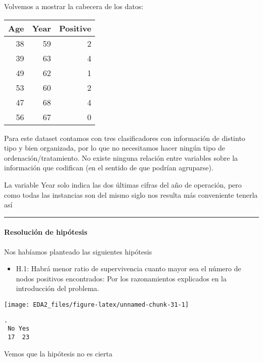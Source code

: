 \documentclass[
]{article}
\providecommand{\tightlist}{%
  \setlength{\itemsep}{0pt}\setlength{\parskip}{0pt}}
\begin{document}
Volvemos a mostrar la cabecera de los datos:

\begin{tabular}{r|r|r}
\hline
Age & Year & Positive\\
\hline
38 & 59 & 2\\
\hline
39 & 63 & 4\\
\hline
49 & 62 & 1\\
\hline
53 & 60 & 2\\
\hline
47 & 68 & 4\\
\hline
56 & 67 & 0\\
\hline
\end{tabular}

Para este dataset contamos con tres clasificadores con información de
distinto tipo y bien organizada, por lo que no necesitamos hacer ningún
tipo de ordenación/tratamiento. No existe ninguna relación entre
variables sobre la información que codifican (en el sentido de que
podrían agruparse).

La variable Year solo indica las dos últimas cifras del año de
operación, pero como todas las instancias son del mismo siglo nos
resulta más conveniente tenerla así

\begin{center}\rule{0.5\linewidth}{0.5pt}\end{center}

\hypertarget{resoluciuxf3n-de-hipuxf3tesis}{%
\paragraph{Resolución de
hipótesis}\label{resoluciuxf3n-de-hipuxf3tesis}}

Nos habíamos planteado las siguientes hipótesis

\begin{itemize}
\tightlist
\item
  H.1: Habrá menor ratio de supervivencia cuanto mayor sea el número de
  nodos positivos encontrados: Por los razonamientos explicados en la
  introducción del problema.
\end{itemize}

\begin{center}\texttt{[image: EDA2\_files/figure-latex/unnamed-chunk-31-1]} \end{center}

\begin{verbatim}
.
 No Yes 
 17  23 
\end{verbatim}

Vemos que la hipótesis no es cierta
\end{document}
